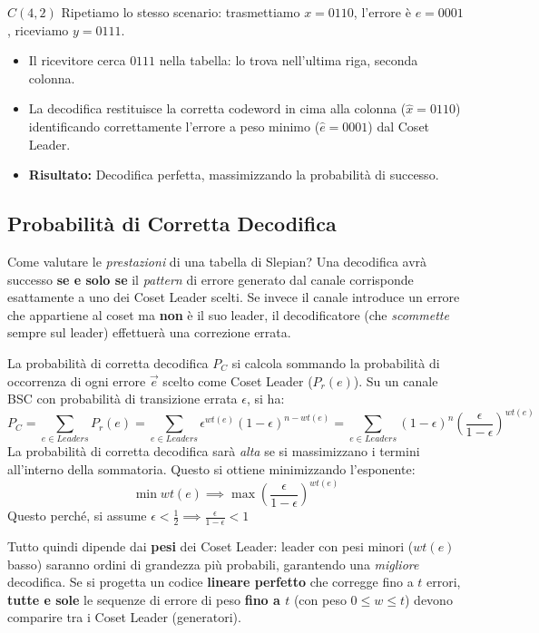 \begin{esempio}{$C(4,2)$}
Ripetiamo lo stesso scenario: trasmettiamo $x=0110$, l'errore è $e=0001$, riceviamo \textbf{$y=0111$}.
\begin{itemize}
    \item Il ricevitore cerca $0111$ nella tabella: lo trova nell'ultima riga, seconda colonna.
    \item La decodifica restituisce la corretta codeword in cima alla colonna ($\hat{x}=0110$) identificando correttamente l'errore a peso minimo ($\hat{e}=0001$) dal Coset Leader.
    \item \textbf{Risultato:} Decodifica perfetta, massimizzando la probabilità di successo.
\end{itemize}
\end{esempio}





\subsection{Probabilità di Corretta Decodifica}
Come valutare le \textit{prestazioni} di una tabella di Slepian? Una decodifica avrà successo \textbf{se e solo se} il \textit{pattern} di errore generato dal canale corrisponde esattamente a uno dei Coset Leader scelti. Se invece il canale introduce un errore che appartiene al coset ma \textbf{non} è il suo leader, il decodificatore (che \textit{scommette} sempre sul leader) effettuerà una correzione errata.

La probabilità di corretta decodifica $P_C$ si calcola sommando la probabilità di occorrenza di ogni errore $\vec{e}$ scelto come Coset Leader ($P_r(e)$). Su un canale BSC con probabilità di transizione errata $\epsilon$, si ha:
\[P_C=\sum_{e \in Leaders} P_r(e)=\sum_{e \in Leaders} \epsilon^{wt(e)} (1-\epsilon)^{n-wt(e)} = \sum_{e \in Leaders} (1-\epsilon)^n \left( \frac{\epsilon}{1-\epsilon} \right)^{wt(e)}
\]
La probabilità di corretta decodifica sarà \textit{alta} se si massimizzano i termini all'interno della sommatoria. Questo si ottiene minimizzando l'esponente:
\[\min wt(e) \implies \max \left( \frac{\epsilon}{1-\epsilon} \right)^{wt(e)}\]
Questo perché, si assume $\epsilon < \frac{1}{2} \implies \frac{\epsilon}{1-\epsilon}  < 1 $

Tutto quindi dipende dai \textbf{pesi} dei Coset Leader: leader con pesi minori ($wt(e)$ basso) saranno ordini di grandezza più probabili, garantendo una \textit{migliore} decodifica.
Se si progetta un codice \textbf{lineare perfetto} che corregge fino a $t$ errori, \textbf{tutte e sole} le sequenze di errore di peso \textbf{fino a $t$} (con peso $0 \leq w \leq t$) devono comparire tra i Coset Leader (generatori). 

